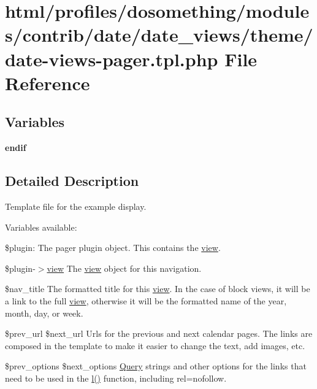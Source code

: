 \hypertarget{date-views-pager_8tpl_8php}{
\section{html/profiles/dosomething/modules/contrib/date/date\_\-views/theme/date-\/views-\/pager.tpl.php File Reference}
\label{date-views-pager_8tpl_8php}
}
\subsection*{Variables}
\begin{DoxyCompactItemize}
\item 
\hypertarget{date-views-pager_8tpl_8php_a82cd33ca97ff99f2fcc5e9c81d65251b}{
{\bfseries endif}}
\label{date-views-pager_8tpl_8php_a82cd33ca97ff99f2fcc5e9c81d65251b}

\end{DoxyCompactItemize}


\subsection{Detailed Description}
Template file for the example display.

Variables available:

\$plugin: The pager plugin object. This contains the \hyperlink{classview}{view}.

\$plugin-\/$>$\hyperlink{classview}{view} The \hyperlink{classview}{view} object for this navigation.

\$nav\_\-title The formatted title for this \hyperlink{classview}{view}. In the case of block views, it will be a link to the full \hyperlink{classview}{view}, otherwise it will be the formatted name of the year, month, day, or week.

\$prev\_\-url \$next\_\-url Urls for the previous and next calendar pages. The links are composed in the template to make it easier to change the text, add images, etc.

\$prev\_\-options \$next\_\-options \hyperlink{classQuery}{Query} strings and other options for the links that need to be used in the \hyperlink{common_8inc_ad3b36c06dc46250b8d22b8d0d2e7bd97}{l()} function, including rel=nofollow. 